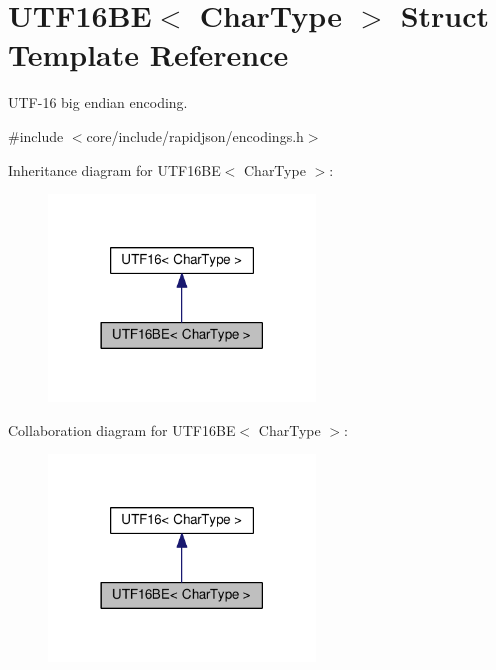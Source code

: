 \hypertarget{structUTF16BE}{}\section{U\+T\+F16\+BE$<$ Char\+Type $>$ Struct Template Reference}
\label{structUTF16BE}


U\+T\+F-\/16 big endian encoding.  




{\ttfamily \#include $<$core/include/rapidjson/encodings.\+h$>$}



Inheritance diagram for U\+T\+F16\+BE$<$ Char\+Type $>$\+:
\nopagebreak
\begin{figure}[H]
\begin{center}
\leavevmode
\includegraphics[width=201pt]{structUTF16BE__inherit__graph}
\end{center}
\end{figure}


Collaboration diagram for U\+T\+F16\+BE$<$ Char\+Type $>$\+:
\nopagebreak
\begin{figure}[H]
\begin{center}
\leavevmode
\includegraphics[width=201pt]{structUTF16BE__coll__graph}
\end{center}
\end{figure}

